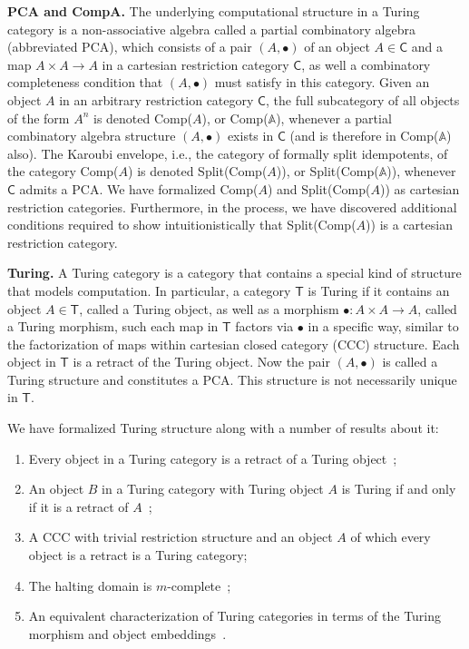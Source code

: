 \documentclass{entcs} \usepackage{entcsmacro}
\begin{document}
{\bfseries PCA and CompA.} The underlying computational structure in a Turing category is a non-associative algebra called a partial combinatory algebra (abbreviated PCA), which consists of a pair $(A, \bullet)$ of an object $A \in \mathsf{C}$ and a map $A \times A \to A$ in a cartesian restriction category $\mathsf{C}$, as well a combinatory completeness condition that $(A, \bullet)$ must satisfy in this category. Given an object $A$ in an arbitrary restriction category $\mathsf{C}$, the full subcategory of all objects of the form $A^n$ is denoted Comp($A$), or Comp($\mathbb{A}$), whenever a partial combinatory algebra structure $(A, \bullet)$ exists in $\mathsf{C}$ (and is therefore in Comp($\mathbb{A}$) also). The Karoubi envelope, i.e., the category of formally split idempotents, of the category Comp($A$) is denoted Split(Comp($A$)), or Split(Comp($\mathbb{A}$)), whenever $\mathsf{C}$ admits a PCA. We have formalized Comp($A$) and Split(Comp($A$)) as cartesian restriction categories. Furthermore, in the process, we have discovered additional conditions required to show intuitionistically that Split(Comp($A$)) is a cartesian restriction category. 

{\bfseries Turing.} A Turing category is a category that contains a special kind of structure that models computation. In particular, a category $\mathsf{T}$ is Turing if it contains an object $A \in \mathsf{T}$, called a Turing object, as well as a morphism $\bullet : A \times A \to A$, called a Turing morphism, such each map in $\mathsf{T}$ factors via $\bullet$ in a specific way, similar to the factorization of maps within cartesian closed category (CCC) structure. Each object in $\mathsf{T}$ is a retract of the Turing object. Now the pair $(A, \bullet)$ is called a Turing structure and constitutes a PCA. This structure is not necessarily unique in $\mathsf{T}$.

We have formalized Turing structure along with a number of results about it:

\begin{enumerate}
\item Every object in a Turing category is a retract of a Turing object~\cite{Turing};
\item An object $B$ in a Turing category with Turing object $A$ is Turing if and only if it is a retract of $A$~\cite{Turing};
	
\item A CCC with trivial restriction structure and an object $A$ of which every object is a retract is a Turing category;
\item The halting domain is $m$-complete~\cite{Turing};
	
\item An equivalent characterization of Turing categories in terms of the Turing morphism and object embeddings~\cite{Turing}.
	
\end{enumerate}
\end{document}
